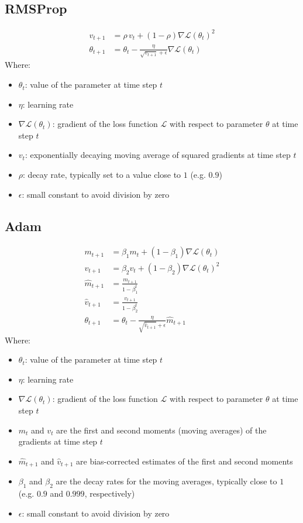 \documentclass[a4paper]{article}
\newcommand{\ELL}{\mathcal{L}}
\begin{document}
\subsection*{RMSProp}
\begin{align*}
    v_{t+1} &= \rho \, v_{t} + (1-\rho) {\nabla\ELL(\theta_t)}^2 \\
    \theta_{t+1} &= \theta_{t} - \frac{\eta}{\sqrt{v_{t+1}} + \epsilon} \nabla\ELL(\theta_t)
\end{align*}
Where:
\begin{itemize}
    \item $\theta_t$: value of the parameter at time step $t$
    \item $\eta$: learning rate
    \item $\nabla\ELL(\theta_t)$: gradient of the loss function $\ELL$ with respect to parameter $\theta$ at time step $t$
    \item $v_t$: exponentially decaying moving average of squared gradients at time step $t$
    \item $\rho$: decay rate, typically set to a value close to $1$ (e.g. $0.9$)
    \item $\epsilon$: small constant to avoid division by zero
\end{itemize}

\subsection*{Adam}
\begin{align*}
    m_{t+1} &= \beta_1 m_t + (1-\beta_1) \nabla\ELL(\theta_t) \\
    v_{t+1} &= \beta_2 v_t + (1-\beta_2) \nabla\ELL(\theta_t)^2\\
    \hat{m}_{t+1} &= \frac{m_{t+1}}{1-\beta_1^t}\\
    \hat{v}_{t+1} &= \frac{v_{t+1}}{1-\beta_2^t}\\
    \theta_{t+1} &= \theta_t - \frac{\eta}{\sqrt{\hat{v}_{t+1}}+\epsilon} \hat{m}_{t+1}
\end{align*}
Where:
\begin{itemize}
    \item $\theta_t$: value of the parameter at time step $t$
    \item $\eta$: learning rate
    \item $\nabla\ELL(\theta_t)$: gradient of the loss function $\ELL$ with respect to parameter $\theta$ at time step $t$
    \item $m_t$ and $v_t$ are the first and second moments (moving averages) of the gradients at time step $t$
    \item $\hat{m}_{t+1}$ and $\hat{v}_{t+1}$ are bias-corrected estimates of the first and second moments
    \item $\beta_1$ and $\beta_2$ are the decay rates for the moving averages, typically close to $1$ (e.g. $0.9$ and $0.999$, respectively)
    \item $\epsilon$: small constant to avoid division by zero
\end{itemize}
\end{document}

